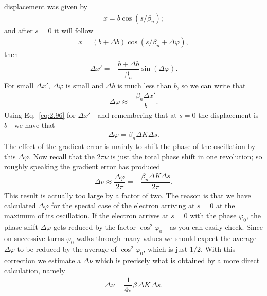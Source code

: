 displacement was given by
\begin{align}
	x = b \cos{(s/\beta_n)};
\end{align}
and after $s = 0$ it will follow
\begin{align}
	x = (b + \Delta b) \cos(s/\beta_n+\Delta\varphi),
\end{align}
then
\begin{align}
	\Delta x' = -\dfrac{b+\Delta b}{\beta_n} \sin{\left(\Delta\varphi\right)}.
\end{align}
For small $\Delta x'$, $\Delta \varphi$ is small and $\Delta b$ is much less than $b$, so we can write that
\begin{align}
	\Delta \varphi \approx -\dfrac{\beta_n \Delta x'}{b}.
\end{align}
Using Eq.~\eqref{eq:2.96} for $\Delta x'$ - and remembering that at $s=0$ the displacement is $b$ - we have that
\begin{align}
	\Delta \varphi = \beta_n \Delta K \Delta s.
\end{align}
The effect of the gradient error is mainly to shift the phase of the oscillation by this $\Delta \varphi$. Now recall that the $2\pi\nu$ is just the total phase shift in one revolution; so roughly speaking the gradient error has produced
\begin{align}
	\Delta\nu \approx \dfrac{\Delta\varphi}{2\pi} = - \dfrac{\beta_n \Delta K \Delta s }{2\pi}.
\end{align}
This result is actually too large by a factor of two. The reason is that we have calculated $\Delta \varphi$ for the special case of the electron arriving at $s = 0$ at the maximum
of its oscillation. If the electron arrives at $s = 0$ with the phase $\varphi_0$, the phase
shift $\Delta\varphi$ gets reduced by the factor $\cos^2\varphi_0$ - as you can easily check.
 Since on successive turns $\varphi_0$ walks through many values we should expect the average $\Delta \varphi$ to be reduced by the average of $\cos^2\varphi_0$, which is just $1/2$. With this correction we estimate a $\Delta\nu$ which is precisely what is obtained by a more direct calculation, namely
\begin{align}
	\Delta\nu = \dfrac{1}{4\pi}\beta\, \Delta K\, \Delta s.
\end{align}

